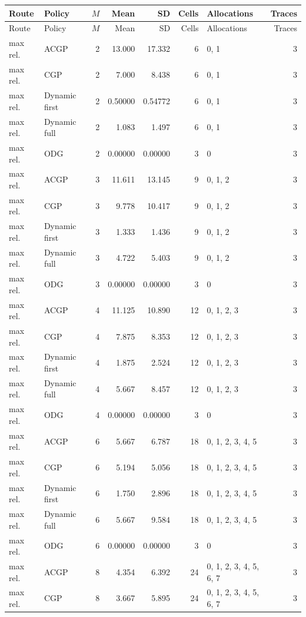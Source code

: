 \documentclass[10pt,a4paper]{article}
\begin{document}
\tiny\setlength{\tabcolsep}{2pt}\begin{longtable}{@{}p{23mm}p{29mm}rrrrp{36mm}r@{}}
\toprule Route & Policy & $M$ & Mean & SD & Cells & Allocations & Traces \\ \midrule\endfirsthead
\toprule Route & Policy & $M$ & Mean & SD & Cells & Allocations & Traces \\ \midrule\endhead
\bottomrule\endfoot
max rel. & ACGP & 2 & 13.000 & 17.332 & 6 & 0, 1 & 3 \\
max rel. & CGP & 2 & 7.000 & 8.438 & 6 & 0, 1 & 3 \\
max rel. & Dynamic first & 2 & 0.50000 & 0.54772 & 6 & 0, 1 & 3 \\
max rel. & Dynamic full & 2 & 1.083 & 1.497 & 6 & 0, 1 & 3 \\
max rel. & ODG & 2 & 0.00000 & 0.00000 & 3 & 0 & 3 \\
max rel. & ACGP & 3 & 11.611 & 13.145 & 9 & 0, 1, 2 & 3 \\
max rel. & CGP & 3 & 9.778 & 10.417 & 9 & 0, 1, 2 & 3 \\
max rel. & Dynamic first & 3 & 1.333 & 1.436 & 9 & 0, 1, 2 & 3 \\
max rel. & Dynamic full & 3 & 4.722 & 5.403 & 9 & 0, 1, 2 & 3 \\
max rel. & ODG & 3 & 0.00000 & 0.00000 & 3 & 0 & 3 \\
max rel. & ACGP & 4 & 11.125 & 10.890 & 12 & 0, 1, 2, 3 & 3 \\
max rel. & CGP & 4 & 7.875 & 8.353 & 12 & 0, 1, 2, 3 & 3 \\
max rel. & Dynamic first & 4 & 1.875 & 2.524 & 12 & 0, 1, 2, 3 & 3 \\
max rel. & Dynamic full & 4 & 5.667 & 8.457 & 12 & 0, 1, 2, 3 & 3 \\
max rel. & ODG & 4 & 0.00000 & 0.00000 & 3 & 0 & 3 \\
max rel. & ACGP & 6 & 5.667 & 6.787 & 18 & 0, 1, 2, 3, 4, 5 & 3 \\
max rel. & CGP & 6 & 5.194 & 5.056 & 18 & 0, 1, 2, 3, 4, 5 & 3 \\
max rel. & Dynamic first & 6 & 1.750 & 2.896 & 18 & 0, 1, 2, 3, 4, 5 & 3 \\
max rel. & Dynamic full & 6 & 5.667 & 9.584 & 18 & 0, 1, 2, 3, 4, 5 & 3 \\
max rel. & ODG & 6 & 0.00000 & 0.00000 & 3 & 0 & 3 \\
max rel. & ACGP & 8 & 4.354 & 6.392 & 24 & 0, 1, 2, 3, 4, 5, 6, 7 & 3 \\
max rel. & CGP & 8 & 3.667 & 5.895 & 24 & 0, 1, 2, 3, 4, 5, 6, 7 & 3 \\

\end{longtable}
\end{document}
